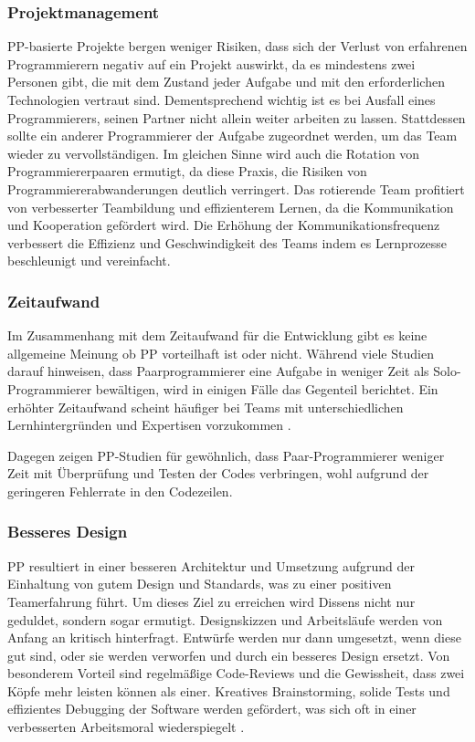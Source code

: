 \subsubsection {Projektmanagement} PP-basierte Projekte bergen weniger Risiken, dass sich der Verlust von erfahrenen Programmierern negativ auf ein Projekt auswirkt, da es mindestens zwei Personen gibt, die mit dem Zustand jeder Aufgabe und mit den erforderlichen Technologien vertraut sind. Dementsprechend wichtig ist es bei Ausfall eines Programmierers, seinen Partner nicht allein weiter arbeiten zu lassen. Stattdessen sollte ein anderer Programmierer der Aufgabe zugeordnet werden, um das Team wieder zu vervollständigen. Im gleichen Sinne wird auch die Rotation von Programmiererpaaren ermutigt, da diese Praxis, die Risiken von Programmiererabwanderungen deutlich verringert. Das rotierende Team profitiert von verbesserter Teambildung und effizienterem Lernen, da die Kommunikation und Kooperation gefördert wird. Die Erhöhung der Kommunikationsfrequenz verbessert die Effizienz und Geschwindigkeit des Teams indem es Lernprozesse beschleunigt und vereinfacht.


\subsubsection {Zeitaufwand} Im Zusammenhang mit dem Zeitaufwand für die Entwicklung gibt es keine allgemeine Meinung ob PP vorteilhaft ist oder nicht. Während viele Studien darauf hinweisen, dass Paarprogrammierer eine Aufgabe in weniger Zeit als Solo-Programmierer bewältigen, wird in einigen Fälle das Gegenteil berichtet. Ein erhöhter Zeitaufwand scheint häufiger bei Teams mit unterschiedlichen Lernhintergründen und Expertisen vorzukommen \cite{Cockburn2001TheProgramming}.


Dagegen zeigen PP-Studien für gewöhnlich, dass Paar-Programmierer weniger Zeit mit Überprüfung und Testen der Codes verbringen, wohl aufgrund der geringeren Fehlerrate in den Codezeilen.


\subsubsection {Besseres Design} PP resultiert in einer besseren Architektur und Umsetzung aufgrund der Einhaltung von gutem Design und Standards, was zu einer positiven Teamerfahrung führt. Um dieses Ziel zu erreichen wird Dissens nicht nur geduldet, sondern sogar ermutigt. Designskizzen und Arbeitsläufe werden von Anfang an kritisch hinterfragt. Entwürfe werden nur dann umgesetzt, wenn diese gut sind, oder sie werden verworfen und durch ein besseres Design ersetzt. Von besonderem Vorteil sind regelmäßige Code-Reviews und die Gewissheit, dass zwei Köpfe mehr leisten können als einer. Kreatives Brainstorming, solide Tests und effizientes Debugging der Software werden gefördert, was sich oft in einer  verbesserten Arbeitsmoral wiederspiegelt \cite{Begel2008PairMe,Cockburn2001TheProgramming}.


